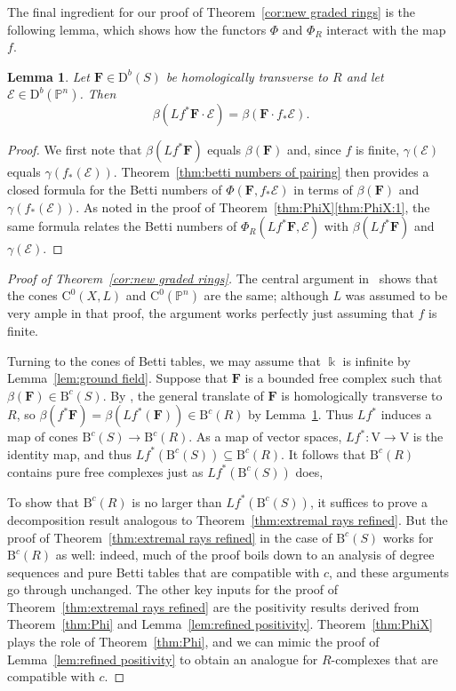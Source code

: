 \documentclass[12pt]{amsart}
\newtheorem{lemma}{Lemma}[section]
\theoremstyle{definition}
\theoremstyle{remark}
\newcommand{\kk}{\Bbbk}
\newcommand{\PP}{\mathbb{P}}
\newcommand{\VV}{\mathrm{V}}
\newcommand{\cc}{c}
\newcommand{\cE}{\mathcal{E}}
\newcommand{\FF}{\mathbf{F}}
\newcommand{\DD}{\mathrm{D}}
\newcommand{\CQ}{\mathrm{C}}
\newcommand{\BBQ}{\mathrm{B}}
\begin{document}
The final ingredient for our proof of Theorem~\ref{cor:new graded rings} is the following lemma, which shows how the functors $\Phi$ and $\Phi_{R}$ interact with the map $f$.


\begin{lemma}\label{lem:general pairing}
Let $\FF\in \DD^b(S)$ be homologically transverse to $R$ and let $\cE\in \DD^b(\PP^n)$.  Then
\[
\beta(Lf^*\FF\cdot \cE)=\beta(\FF\cdot f_*\cE).
\]
\end{lemma}
\begin{proof}
We first note that $\beta(Lf^*\FF)$ equals $\beta(\FF)$ and, since $f$ is finite, $\gamma(\cE)$ equals $\gamma(f_*(\cE))$.  Theorem~\ref{thm:betti numbers of pairing} then provides a closed formula for the Betti numbers of $\Phi(\FF,f_*\cE)$ in terms of $\beta(\FF)$ and $\gamma(f_*(\cE))$.  As noted in the proof of Theorem~\ref{thm:PhiX}\eqref{thm:PhiX:1}, the same formula relates the Betti numbers of $\Phi_{R}(Lf^*\FF,\cE)$ with  $\beta(Lf^*\FF)$ and $\gamma(\cE)$.
\end{proof}

\begin{proof}[Proof of Theorem~\ref{cor:new graded rings}]
The central argument in~\cite[Proof of Theorem 5]{eis-schrey-abel} shows that the cones
$\CQ^0(X,L)$ and $\CQ^{0}(\PP^n)$ are the same;
 although $L$ was assumed to be very ample in that proof, the  argument works perfectly just assuming that $f$ is finite.

Turning to the cones of Betti tables, 
we may assume that $\kk$ is infinite by Lemma~\ref{lem:ground field}. Suppose that $\FF$ is a bounded
free complex such that $\beta(\FF)\in \BBQ^{\cc}(S)$.
By \cite[Theorem, p.\ 335]{miller-speyer}, the general translate of $\FF$ is homologically transverse to $R$,
so $\beta(f^{*}\FF) = \beta(Lf^{*}(\FF))\in \BBQ^{\cc}(R)$ by Lemma~\ref{lem:general pairing}. Thus
$Lf^{*}$ induces a map of cones $\BBQ^{\cc}(S)\to \BBQ^{\cc}(R)$.
As a map of vector spaces, $Lf^*\colon \VV\to \VV$ 
is the identity map, and thus 
$
Lf^*(\BBQ^{\cc}(S))\subseteq \BBQ^{\cc}(R).
$
It follows that $\BBQ^{\cc}(R)$ contains pure free complexes just as $Lf^*(\BBQ^{\cc}(S))$ does,

To show that  $\BBQ^{\cc}(R)$ is no larger than $Lf^*(\BBQ^{\cc}(S))$, it suffices to prove
a decomposition result analogous to Theorem~\ref{thm:extremal rays refined}. But
the proof of Theorem~\ref{thm:extremal rays refined} in the case of $\BBQ^{\cc}(S)$ works for $\BBQ^{\cc}(R)$ as well: indeed, much of the proof boils down to an analysis of degree sequences and pure Betti tables that are compatible with $\cc$, and these arguments go through unchanged.  The other key inputs for the proof of Theorem~\ref{thm:extremal rays refined} are the positivity results derived from Theorem~\ref{thm:Phi} and Lemma~\ref{lem:refined positivity}.  Theorem~\ref{thm:PhiX} plays the role of Theorem~\ref{thm:Phi}, and we can mimic the proof of Lemma~\ref{lem:refined positivity} to obtain an analogue for $R$-complexes that are compatible with $\cc$.  
\end{proof}
\end{document}
